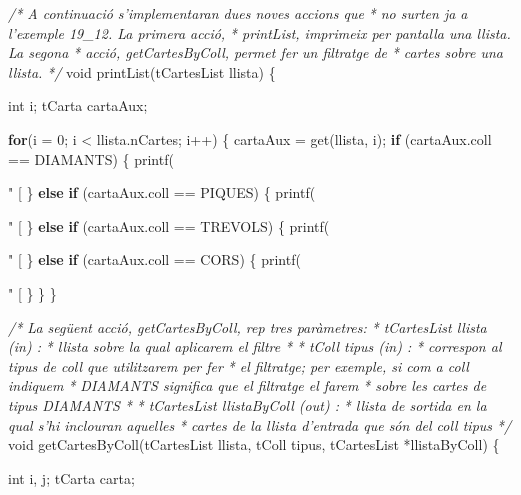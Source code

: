 \documentclass[]{book}
\newenvironment{Shaded}{\begin{snugshade}}{\end{snugshade}}
\newcommand{\DataTypeTok}[1]{\textcolor[rgb]{0.13,0.29,0.53}{#1}}
\newcommand{\DecValTok}[1]{\textcolor[rgb]{0.00,0.00,0.81}{#1}}
\newcommand{\SpecialCharTok}[1]{\textcolor[rgb]{0.00,0.00,0.00}{#1}}
\newcommand{\StringTok}[1]{\textcolor[rgb]{0.31,0.60,0.02}{#1}}
\newcommand{\CommentTok}[1]{\textcolor[rgb]{0.56,0.35,0.01}{\textit{#1}}}
\newcommand{\ControlFlowTok}[1]{\textcolor[rgb]{0.13,0.29,0.53}{\textbf{#1}}}
\newcommand{\NormalTok}[1]{#1}
\begin{document}
\begin{Shaded}
\begin{Highlighting}[]
\CommentTok{/* A continuació s'implementaran dues noves accions que}
\CommentTok{ * no surten ja a l'exemple 19_12. La primera acció, }
\CommentTok{ * printList, imprimeix per pantalla una llista. La segona}
\CommentTok{ * acció, getCartesByColl, permet fer un filtratge de }
\CommentTok{ * cartes sobre una llista. }
\CommentTok{ */}
\DataTypeTok{void}\NormalTok{ printList(tCartesList llista) \{}

    \DataTypeTok{int}\NormalTok{ i;}
\NormalTok{    tCarta cartaAux;}

    \ControlFlowTok{for}\NormalTok{(i = }\DecValTok{0}\NormalTok{; i < llista.nCartes; i++) \{ }
\NormalTok{        cartaAux = get(llista, i);}
        \ControlFlowTok{if}\NormalTok{ (cartaAux.coll == DIAMANTS) \{}
\NormalTok{            printf(}\StringTok{" [%
\NormalTok{        \} }\ControlFlowTok{else} \ControlFlowTok{if}\NormalTok{ (cartaAux.coll == PIQUES) \{}
\NormalTok{            printf(}\StringTok{" [%
\NormalTok{        \} }\ControlFlowTok{else} \ControlFlowTok{if}\NormalTok{ (cartaAux.coll == TREVOLS) \{}
\NormalTok{            printf(}\StringTok{" [%
\NormalTok{        \} }\ControlFlowTok{else} \ControlFlowTok{if}\NormalTok{ (cartaAux.coll == CORS) \{}
\NormalTok{            printf(}\StringTok{" [%
\NormalTok{        \}}
\NormalTok{    \}}
\NormalTok{\}}

\CommentTok{/* La següent acció, getCartesByColl, rep tres paràmetres:}
\CommentTok{ * tCartesList llista (in) : }
\CommentTok{ * llista sobre la qual aplicarem el filtre}
\CommentTok{ * }
\CommentTok{ * tColl tipus (in) : }
\CommentTok{ * correspon al tipus de coll que utilitzarem per fer }
\CommentTok{ * el filtratge; per exemple, si com a coll indiquem }
\CommentTok{ * DIAMANTS significa que el filtratge el farem}
\CommentTok{ * sobre les cartes de tipus DIAMANTS}
\CommentTok{ *}
\CommentTok{ * tCartesList llistaByColl (out) :}
\CommentTok{ * llista de sortida en la qual s'hi inclouran aquelles}
\CommentTok{ * cartes de la llista d'entrada que són del coll tipus }
\CommentTok{ */}
\DataTypeTok{void}\NormalTok{ getCartesByColl(tCartesList llista, tColl tipus, tCartesList *llistaByColl) \{}

    \DataTypeTok{int}\NormalTok{ i, j;}
\NormalTok{    tCarta carta;}

}}}}
\end{Highlighting}
\end{Shaded}
\end{document}
